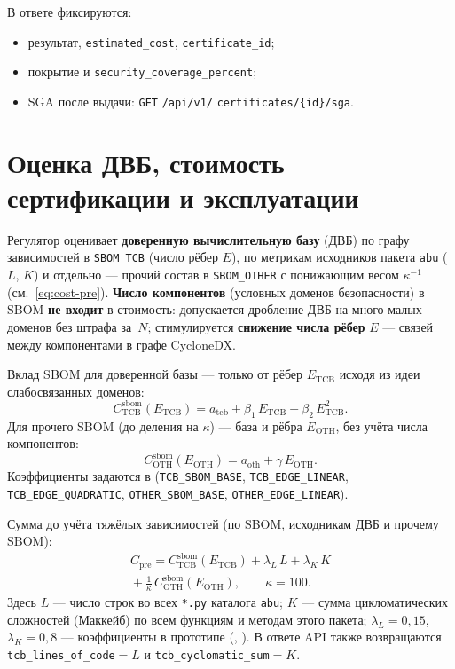 В ответе фиксируются:

\begin{itemize}
  \item результат, \texttt{estimated\_cost}, \texttt{certificate\_id};
  \item покрытие и \texttt{security\_coverage\_percent};
  \item SGA после выдачи: \texttt{GET} \texttt{/api/v1/} \texttt{certificates/\{id\}/sga}.
\end{itemize}

\section{Оценка ДВБ, стоимость сертификации и эксплуатации}
\label{sec:dvb-cost}

Регулятор оценивает \textbf{доверенную вычислительную базу} (ДВБ) по графу зависимостей в \texttt{SBOM\_TCB} (число рёбер $E$), по метрикам исходников пакета \texttt{abu} ($L$, $K$) и отдельно --- прочий состав в \texttt{SBOM\_OTHER} с понижающим весом $\kappa^{-1}$ (см.~\eqref{eq:cost-pre}). \textbf{Число компонентов} (условных доменов безопасности) в SBOM \textbf{не входит} в стоимость: допускается дробление ДВБ на много малых доменов без штрафа за~$N$; стимулируется \textbf{снижение числа рёбер} $E$ --- связей между компонентами в графе CycloneDX.

Вклад SBOM для доверенной базы --- только от рёбер $E_{\mathrm{TCB}}$ исходя из идеи слабосвязанных доменов:
\begin{equation}
\label{eq:cost-tcb-sbom}
  C_{\mathrm{TCB}}^{\mathrm{sbom}}(E_{\mathrm{TCB}}) = a_{\mathrm{tcb}} + \beta_1\, E_{\mathrm{TCB}} + \beta_2\, E_{\mathrm{TCB}}^{2}.
\end{equation}
Для прочего SBOM (до деления на $\kappa$) --- база и рёбра $E_{\mathrm{OTH}}$, без учёта числа компонентов:
\begin{equation}
\label{eq:cost-oth-sbom}
  C_{\mathrm{OTH}}^{\mathrm{sbom}}(E_{\mathrm{OTH}}) = a_{\mathrm{oth}} + \gamma\, E_{\mathrm{OTH}}.
\end{equation}
Коэффициенты задаются в  (\texttt{TCB\_SBOM\_BASE}, \texttt{TCB\_EDGE\_LINEAR}, \texttt{TCB\_EDGE\_QUADRATIC}, \texttt{OTHER\_SBOM\_BASE}, \texttt{OTHER\_EDGE\_LINEAR}).

Сумма до учёта тяжёлых зависимостей (по SBOM, исходникам ДВБ и прочему SBOM):
\begin{multline}
\label{eq:cost-pre}
  C_{\mathrm{pre}} = C_{\mathrm{TCB}}^{\mathrm{sbom}}(E_{\mathrm{TCB}}) + \lambda_L\, L + \lambda_K\, K \\
  {}+ \frac{1}{\kappa}\, C_{\mathrm{OTH}}^{\mathrm{sbom}}(E_{\mathrm{OTH}}), \qquad \kappa = 100.
\end{multline}
Здесь $L$ --- число строк во всех \texttt{*.py} каталога \texttt{abu}; $K$ --- сумма цикломатических сложностей (Маккейб) по всем функциям и методам этого пакета; $\lambda_L = 0{,}15$, $\lambda_K = 0{,}8$ --- коэффициенты в прототипе (, ). В ответе API также возвращаются \texttt{tcb\_lines\_of\_code}${}=L$ и \texttt{tcb\_cyclomatic\_sum}${}=K$.

